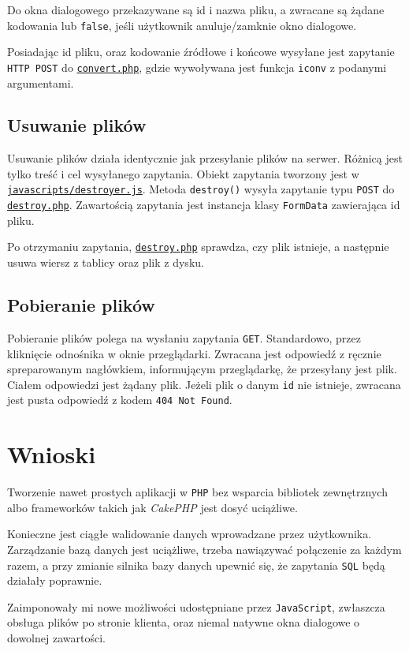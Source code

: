 \documentclass[10pt,a4paper]{article}
\newcommand{\f}[1]{\texttt{#1}}
\newcommand{\rev}{35c18ee3786b53133ca699f3f44c15e18e2d7a25}
\newcommand{\revhref}[1] {\href{https://github.com/student-tomasz/pi-cwiczenie-4/blob/\rev/#1}{\f{#1}}}
\begin{document}
Do okna dialogowego przekazywane są id i nazwa pliku, a zwracane są żądane
kodowania lub \f{false}, jeśli użytkownik anuluje/zamknie okno dialogowe.

Posiadając id pliku, oraz kodowanie źródłowe i końcowe wysyłane jest zapytanie
\f{HTTP POST} do \revhref{convert.php}, gdzie wywoływana jest funkcja \f{iconv}
z podanymi argumentami.


\subsection{Usuwanie plików}

Usuwanie plików działa identycznie jak przesyłanie plików na serwer. Różnicą
jest tylko treść i cel wysyłanego zapytania. Obiekt zapytania tworzony jest w
\revhref{javascripts/destroyer.js}. Metoda \f{destroy()} wysyła zapytanie typu
\f{POST} do \revhref{destroy.php}. Zawartością zapytania jest instancja klasy
\f{FormData} \cite{formdata} zawierająca id pliku.

Po otrzymaniu zapytania, \revhref{destroy.php} sprawdza, czy plik istnieje, a
następnie usuwa wiersz z tablicy oraz plik z dysku.


\subsection{Pobieranie plików}

Pobieranie plików polega na wysłaniu zapytania \f{GET}. Standardowo, przez
kliknięcie odnośnika w oknie przeglądarki. Zwracana jest odpowiedź z ręcznie
spreparowanym nagłówkiem, informującym przeglądarkę, że przesyłany jest plik.
Ciałem odpowiedzi jest żądany plik. Jeżeli plik o danym \f{id} nie istnieje,
zwracana jest pusta odpowiedź z kodem \f{404 Not Found}.



\section{Wnioski}

Tworzenie nawet prostych aplikacji w \f{PHP} bez wsparcia bibliotek zewnętrznych
albo frameworków takich jak \emph{CakePHP} jest dosyć uciążliwe.

Konieczne jest ciągłe walidowanie danych wprowadzane przez użytkownika.
Zarządzanie bazą danych jest uciążliwe, trzeba nawiązywać połączenie za każdym
razem, a przy zmianie silnika bazy danych upewnić się, że zapytania \f{SQL} będą
działały poprawnie.

Zaimponowały mi nowe możliwości udostępniane przez \f{JavaScript}, zwłaszcza
obsługa plików po stronie klienta, oraz niemal natywne okna dialogowe o dowolnej
zawartości.
\end{document}
